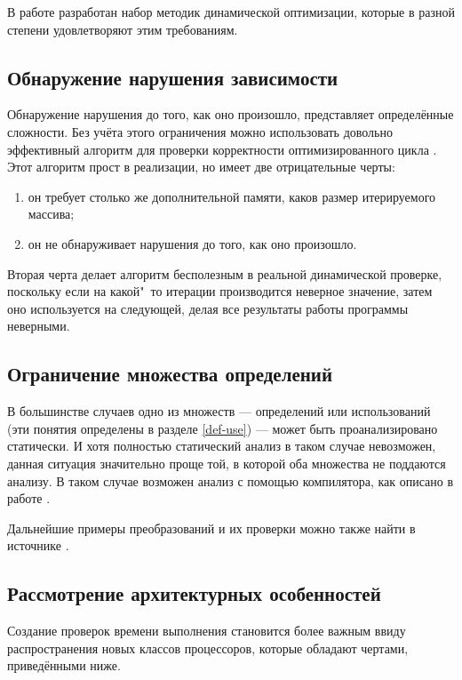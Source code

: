 В работе \cite{ZuckPFGH02} разработан набор методик динамической оптимизации, которые в разной степени удовлетворяют этим требованиям.

\subsection{Обнаружение нарушения зависимости}

Обнаружение нарушения до того, как оно произошло, представляет определённые сложности. Без учёта этого ограничения можно использовать довольно эффективный алгоритм для проверки корректности оптимизированного цикла \cite{ZuckPFGH02}. Этот алгоритм прост в реализации, но имеет две отрицательные черты:

\begin{enumerate}
	\item он требует столько же дополнительной памяти, каков размер итерируемого массива;
	\item он не обнаруживает нарушения до того, как оно произошло.
\end{enumerate}

Вторая черта делает алгоритм бесполезным в реальной динамической проверке, поскольку если на какой"~то итерации производится неверное значение, затем оно используется на следующей, делая все результаты работы программы неверными.

\subsection{Ограничение множества определений}

В большинстве случаев одно из множеств --- определений или использований (эти понятия определены в разделе \ref{def-use}) --- может быть проанализировано статически. И хотя полностью статический анализ в таком случае невозможен, данная ситуация значительно проще той, в которой оба множества не поддаются анализу. В таком случае возможен анализ с помощью компилятора, как описано в работе \cite{ZuckPFGH02}.

Дальнейшие примеры преобразований и их проверки можно также найти в источнике \cite{ZuckPFGH02}.

\subsection{Рассмотрение архитектурных особенностей}

Создание проверок времени выполнения становится более важным ввиду распространения новых классов процессоров, которые обладают чертами, приведёнными ниже.

